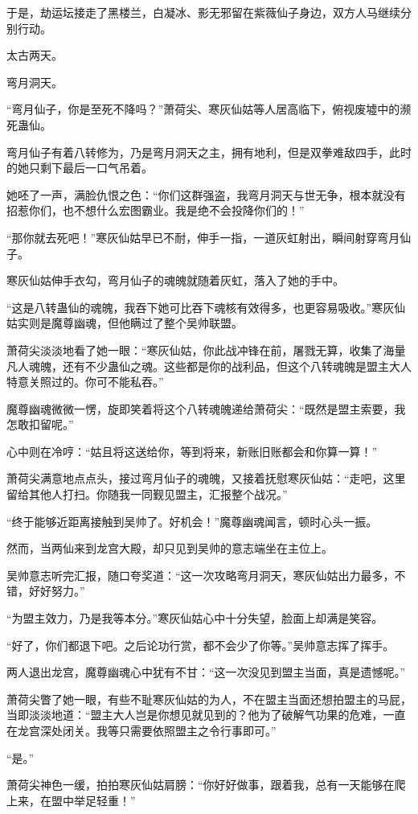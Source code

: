 \begin{this_body}
于是，劫运坛接走了黑楼兰，白凝冰、影无邪留在紫薇仙子身边，双方人马继续分别行动。

太古两天。

弯月洞天。

“弯月仙子，你是至死不降吗？”萧荷尖、寒灰仙姑等人居高临下，俯视废墟中的濒死蛊仙。

弯月仙子有着八转修为，乃是弯月洞天之主，拥有地利，但是双拳难敌四手，此时的她只剩下最后一口气吊着。

她呸了一声，满脸仇恨之色：“你们这群强盗，我弯月洞天与世无争，根本就没有招惹你们，也不想什么宏图霸业。我是绝不会投降你们的！”

“那你就去死吧！”寒灰仙姑早已不耐，伸手一指，一道灰虹射出，瞬间射穿弯月仙子。

寒灰仙姑伸手衣勾，弯月仙子的魂魄就随着灰虹，落入了她的手中。

“这是八转蛊仙的魂魄，我吞下她可比吞下魂核有效得多，也更容易吸收。”寒灰仙姑实则是魔尊幽魂，但他瞒过了整个吴帅联盟。

萧荷尖淡淡地看了她一眼：“寒灰仙姑，你此战冲锋在前，屠戮无算，收集了海量凡人魂魄，还有不少蛊仙之魂。这些都是你的战利品，但这个八转魂魄是盟主大人特意关照过的。你可不能私吞。”

魔尊幽魂微微一愣，旋即笑着将这个八转魂魄递给萧荷尖：“既然是盟主索要，我怎敢扣留呢。”

心中则在冷哼：“姑且将这送给你，等到将来，新账旧账都会和你算一算！”

萧荷尖满意地点点头，接过弯月仙子的魂魄，又接着抚慰寒灰仙姑：“走吧，这里留给其他人打扫。你随我一同觐见盟主，汇报整个战况。”

“终于能够近距离接触到吴帅了。好机会！”魔尊幽魂闻言，顿时心头一振。

然而，当两仙来到龙宫大殿，却只见到吴帅的意志端坐在主位上。

吴帅意志听完汇报，随口夸奖道：“这一次攻略弯月洞天，寒灰仙姑出力最多，不错，好好努力。”

“为盟主效力，乃是我等本分。”寒灰仙姑心中十分失望，脸面上却满是笑容。

“好了，你们都退下吧。之后论功行赏，都不会少了你等。”吴帅意志挥了挥手。

两人退出龙宫，魔尊幽魂心中犹有不甘：“这一次没见到盟主当面，真是遗憾呢。”

萧荷尖瞥了她一眼，有些不耻寒灰仙姑的为人，不在盟主当面还想拍盟主的马屁，当即淡淡地道：“盟主大人岂是你想见就见到的？他为了破解气功果的危难，一直在龙宫深处闭关。我等只需要依照盟主之令行事即可。”

“是。”

萧荷尖神色一缓，拍拍寒灰仙姑肩膀：“你好好做事，跟着我，总有一天能够在爬上来，在盟中举足轻重！”


\end{this_body}
